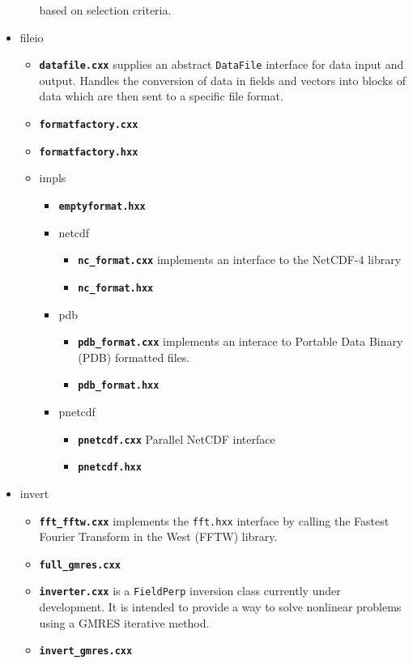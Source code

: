 \documentclass[12pt]{article}
\newcommand{\code}[1]{\texttt{#1}}
\newcommand{\file}[1]{\texttt{\bf #1}}
\begin{document}
\begin{itemize}
\begin{itemize}
    based on selection criteria.
  \end{itemize}
\item fileio
  \begin{itemize}
  \item \file{datafile.cxx} supplies an abstract \code{DataFile} interface
    for data input and output. Handles the conversion of data in fields
    and vectors into blocks of data which are then sent to a specific file
    format.
  \item \file{formatfactory.cxx}
  \item \file{formatfactory.hxx}
  \item impls
    \begin{itemize}
    \item \file{emptyformat.hxx}
    \item netcdf
      \begin{itemize}
      \item \file{nc\_format.cxx} implements an interface to the NetCDF-4 library
      \item \file{nc\_format.hxx} 
      \end{itemize}
    \item pdb
      \begin{itemize}
      \item \file{pdb\_format.cxx} implements an interace to Portable Data
        Binary (PDB) formatted files.
      \item \file{pdb\_format.hxx}
      \end{itemize}
    \item pnetcdf
      \begin{itemize}
        \item \file{pnetcdf.cxx} Parallel NetCDF interface
        \item \file{pnetcdf.hxx}
      \end{itemize}
    \end{itemize}
  \end{itemize}
\item invert
  \begin{itemize}
  \item \file{fft\_fftw.cxx} implements the \code{fft.hxx} interface by calling
    the Fastest Fourier Transform in the West (FFTW) library.
  \item \file{full\_gmres.cxx}
  \item \file{inverter.cxx} is a \code{FieldPerp} inversion class currently
    under development. It is intended to provide a way to solve nonlinear
    problems using a GMRES iterative method.
  \item \file{invert\_gmres.cxx}
  

\end{itemize}
\end{itemize}
\end{document}
